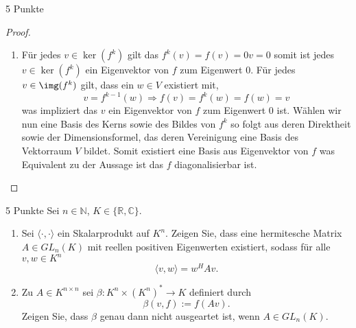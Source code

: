 \documentclass{problemset}
\begin{document}
\begin{problem}{5 Punkte}
\begin{proof}
\begin{enumerate}
        \item Für jedes \(v \in \ker(f^k)\) gilt das \(f^k(v) = f(v) = 0 v = 0\) somit ist
              jedes \(v \in \ker(f^k)\) ein Eigenvektor von \(f\) zum Eigenwert \(0\). Für
              jedes \(v \in \img(f^k)\) gilt, dass ein \(w \in V\) existiert mit,
              \begin{equation*}
                  v = f^{k-1}(w) \Rightarrow f(v) = f^k(w) = f(w) = v
              \end{equation*}
              was impliziert das \(v\) ein Eigenvektor von \(f\) zum Eigenwert \(0\) ist.
              Wählen wir nun eine Basis des Kerns sowie des Bildes von \(f^k\) so folgt aus
              deren Direktheit sowie der Dimensionsformel, das deren Vereinigung eine Basis
              des Vektorraum \(V\) bildet. Somit existiert eine Basis aus Eigenvektor von
              \(f\) was Equivalent zu der Aussage ist das \(f\) diagonalisierbar ist.
    \end{enumerate}
\end{proof}

\end{problem}

\begin{problem}{5 Punkte}
Sei $n \in \mathbb{N}$, $K \in \{\mathbb{R}, \mathbb{C}\}$.
\begin{enumerate}
    \item Sei $\langle \cdot , \cdot \rangle$ ein Skalarprodukt auf $K^n$. Zeigen Sie,
          dass eine hermitesche Matrix $A \in GL_n(K)$ mit reellen positiven Eigenwerten
          existiert, sodass für alle $v, w \in K^n$
          \[
              \langle v, w \rangle = w^H A v.
          \]
    \item Zu $A \in K^{n \times n}$ sei $\beta : K^n \times (K^n)^* \to K$ definiert
          durch
          \[
              \beta(v, f) := f(Av).
          \]
          Zeigen Sie, dass $\beta$ genau dann nicht ausgeartet ist, wenn $A \in GL_n(K)$.
\end{enumerate}
\end{problem}
\end{document}
